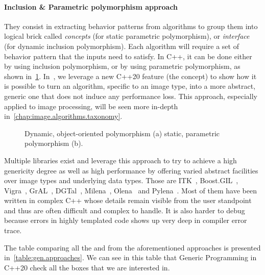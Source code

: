 \paragraph{Inclusion \& Parametric polymorphism approach} They consist in extracting behavior patterns from algorithms
to group them into logical brick called \emph{concepts} (for static parametric polymorphism), or \emph{interface} (for
dynamic inclusion polymorphism). Each algorithm will require a set of behavior pattern that the inputs need to satisfy.
In C++, it can be done either by using inclusion polymorphism, or by using parametric polymorphism, as shown
in~\ref{code:gen.inclupoly}. In~\parencite{roynard.2019.rrpr}, we leverage a new C++20 feature (the concept) to show how
it is possible to turn an algorithm, specific to an image type, into a more abstract, generic one that does not induce
any performance loss. This approach, especially applied to image processing, will be seen more in-depth
in~\cref{chap:image.algorithms.taxonomy}.

\begin{figure}[htb]
  \centering
  \hfil
  \vfil
  \hfil
  \caption{Dynamic, object-oriented polymorphism (a) \vs static, parametric polymorphism (b).}
  \label{code:gen.inclupoly}
\end{figure}

Multiple libraries exist and leverage this approach to try to achieve a high genericity degree as well as high
performance by offering varied abstract facilities over image types and underlying data types. Those are
ITK~\parencite{johnson.2013.ITKSoftwareGuideThirdEdition}, Boost.GIL~\parencite{bourdev.2006.bgil},
Vigra~\parencite{kothe.2011.generic}, GrAL~\parencite{berti.2006.gral}, DGTal~\parencite{coeurjolly.2016.dgtal},
Milena~\parencite{levillain.2009.ismm,levillain.2010.icip},
Olena~\parencite{olena.2000.www,levillain.2011.phd,geraud.2012.hdr,levillain.2014.ciarp} and
Pylena~\parencite{carlinet.2018.pylena}. Most of them have been written in complex C++ whose details remain visible from
the user standpoint and thus are often difficult and complex to handle. It is also harder to debug because errors in
highly templated code shows up very deep in compiler error trace.

The table comparing all the \pros and \cons from the aforementioned approaches is presented
in~\cref{table:gen.approaches}. We can see in this table that Generic Programming in C++20 check all the boxes that we
are interested in.

